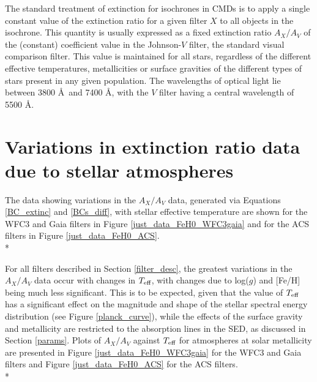 \documentclass[12pt, a4paper]{report}
\begin{document}
The standard treatment of extinction for isochrones in CMDs is to apply a single constant value of the extinction ratio for a given filter $X$ to all objects in the isochrone. This quantity is usually expressed as a fixed extinction ratio $A_{X}/A_{V}$ of the (constant) coefficient value in the Johnson-$V$ filter, the standard visual comparison filter. This value is maintained for all stars, regardless of the different effective temperatures, metallicities or surface gravities of the different types of stars present in any given population. The wavelengths of optical light lie between 3800 \AA\ and 7400 \AA, with the $V$ filter having a central wavelength of 5500 \AA.


\section{Variations in extinction ratio data due to stellar atmospheres} \label{desc_var}

The data showing variations in the $A_{X}/A_{V}$ data, generated via Equations \ref{BC_extinc} and \ref{BCs_diff}, with stellar effective temperature are shown for the WFC3 and Gaia filters in Figure \ref{just_data_FeH0_WFC3gaia} and for the ACS filters in Figure \ref{just_data_FeH0_ACS}. \\*

For all filters described in Section \ref{filter_desc}, the greatest variations in the $A_{X}/A_{V}$ data occur with changes in $T_{\textnormal{eff}}$, with changes due to log($g$) and [Fe/H] being much less significant. This is to be expected, given that the value of $T_{\textnormal{eff}}$ has a significant effect on the magnitude and shape of the stellar spectral energy distribution (see Figure \ref{planck_curve}), while the effects of the surface gravity and metallicity are restricted to the absorption lines in the SED, as discussed in Section \ref{params}. Plots of $A_{X}/A_{V}$ against $T_{\textnormal{eff}}$ for atmospheres at solar metallicity are presented in Figure \ref{just_data_FeH0_WFC3gaia} for the WFC3 and Gaia filters and Figure \ref{just_data_FeH0_ACS} for the ACS filters. \\*
\end{document}
